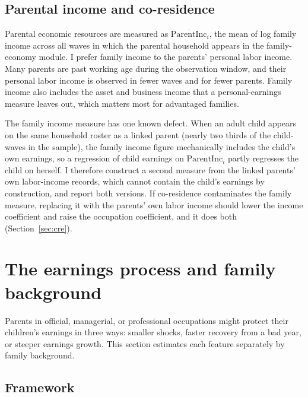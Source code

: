\documentclass[11pt]{article}
\newcommand{\pinc}{\overline{\mathrm{ParentInc}}}
\begin{document}
\subsection{Parental income and co-residence}
\label{sec:parentinc}

Parental economic resources are measured as $\pinc_i$, the mean of log
family income across all waves in which the parental household appears
in the family-economy module. I prefer family income to the parents'
personal labor income. Many parents are past working
age during the observation window, and their personal labor income is observed
in fewer waves and for fewer parents. Family income also includes the
asset and business income that a personal-earnings measure leaves out,
which matters most for advantaged families.

The family income measure has one known defect. When an adult child appears
on the same household roster as a linked parent (nearly two thirds of the child-waves in the sample), the family income figure mechanically
includes the child's own earnings, so a regression of child earnings on
$\pinc_i$ partly regresses the child on herself. I therefore construct
a second measure from the linked parents' own labor-income records,
which cannot contain the child's earnings by construction, and report
both versions. If co-residence contaminates the family measure, replacing
it with the parents' own labor income should lower the income
coefficient and raise the occupation coefficient, and it does both (Section~\ref{sec:cre}).

\section{The earnings process and family background}
\label{sec:process}

Parents in official, managerial, or professional occupations might protect their children's earnings in three ways: smaller shocks, faster recovery from a bad year, or steeper
earnings growth. This section estimates each feature separately by
family background.

\subsection{Framework}
\label{sec:framework}
\end{document}
